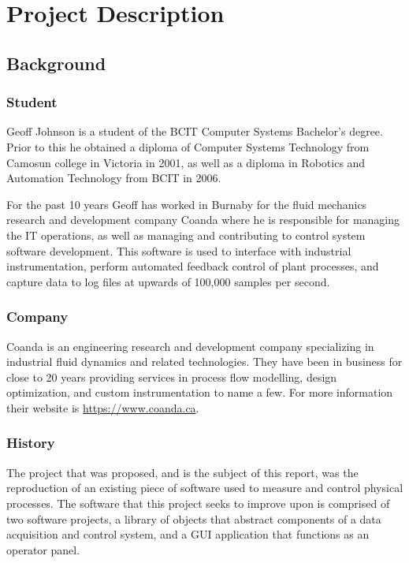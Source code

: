 \section{Project Description}\label{sec:desc}

  \subsection{Background}\label{sec:desc-bg}

    \subsubsection{Student}\label{sec:desc-bg-student}

      Geoff Johnson is a student of the BCIT Computer Systems Bachelor's degree.
      Prior to this he obtained a diploma of Computer Systems Technology from
      Camosun college in Victoria in 2001, as well as a diploma in Robotics and
      Automation Technology from BCIT in 2006.

      For the past 10 years Geoff has worked in Burnaby for the fluid mechanics
      research and development company Coanda where he is responsible for managing
      the IT operations, as well as managing and contributing to control system
      software development. This software is used to interface with industrial
      instrumentation, perform automated feedback control of plant processes,
      and capture data to log files at upwards of 100,000 samples per second.

    \subsubsection{Company}\label{sec:desc-bg-company}

      Coanda is an engineering research and development company specializing in
      industrial fluid dynamics and related technologies. They have been in
      business for close to 20 years providing services in process flow modelling,
      design optimization, and custom instrumentation to name a few. For more
      information their website is \url{https://www.coanda.ca}.

    \subsubsection{History}\label{sec:desc-bg-project}

      The project that was proposed, and is the subject of this report, was the
      reproduction of an existing piece of software used to measure and control
      physical processes. The software that this project seeks to improve upon
      is comprised of two software projects, a library of objects that abstract
      components of a data acquisition and control system, and a GUI application
      that functions as an operator panel.


